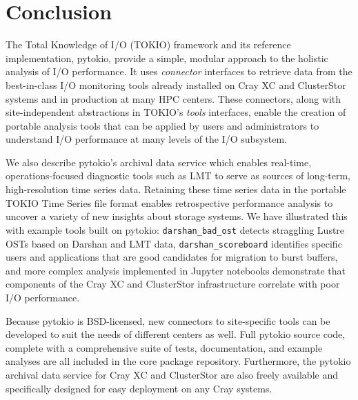 \section{Conclusion}

The Total Knowledge of I/O (TOKIO) framework and its reference implementation, pytokio, provide a simple, modular approach to the holistic analysis of I/O performance.
It uses \emph{connector} interfaces to retrieve data from the best-in-class I/O monitoring tools already installed on Cray XC and ClusterStor systems and in production at many HPC centers.
These connectors, along with site-independent abstractions in TOKIO's \emph{tools} interfaces, enable the creation of portable analysis tools that can be applied by users and administrators to understand I/O performance at many levels of the I/O subsystem.

We also describe pytokio's archival data service which enables real-time, operations-focused diagnostic tools such as LMT to serve as sources of long-term, high-resolution time series data.
Retaining these time series data in the portable TOKIO Time Series file format enables retrospective performance analysis to uncover a variety of new insights about storage systems.
We have illustrated this with example tools built on pytokio:
\texttt{darshan\_bad\_ost} detects straggling Lustre OSTs based on Darshan and LMT data, \texttt{darshan\_scoreboard} identifies specific users and applications that are good candidates for migration to burst buffers, and more complex analysis implemented in Jupyter notebooks demonstrate that components of the Cray XC and ClusterStor infrastructure correlate with poor I/O performance.

Because pytokio is BSD-licensed, new connectors to site-specific tools can be developed to suit the needs of different centers as well.
Full pytokio source code, complete with a comprehensive suite of tests, documentation, and example analyses are all included in the core package repository.
Furthermore, the pytokio archival data service for Cray XC and ClusterStor are also freely available and specifically designed for easy deployment on any Cray systems.